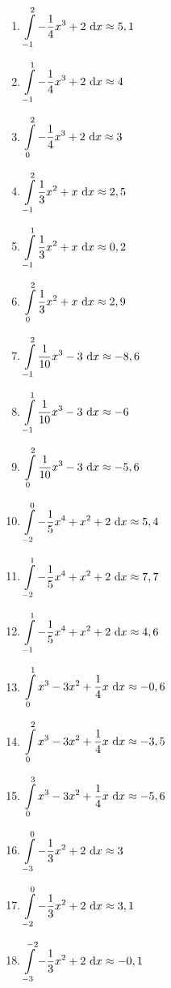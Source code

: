 \begin{Answer}[ref=integralGrafisch1]
	\begin{enumerate}[label=\alph*)]
		\item \(\displaystyle\int\limits_{-1}^{2} -\frac{1}{4}x^3+2\ \text{d} x\approx 5,1\)
		\item \(\displaystyle\int\limits_{-1}^{1} -\frac{1}{4}x^3+2\ \text{d} x\approx 4\)
		\item \(\displaystyle\int\limits_{0}^{2} -\frac{1}{4}x^3+2\ \text{d} x\approx 3\)

		\item \(\displaystyle\int\limits_{-1}^{2} \frac{1}{3}x^2+x\ \text{d} x\approx 2,5\)
		\item \(\displaystyle\int\limits_{-1}^{1} \frac{1}{3}x^2+x\ \text{d} x\approx 0,2\)
		\item \(\displaystyle\int\limits_{0}^{2} \frac{1}{3}x^2+x\ \text{d} x\approx 2,9\)

		\item \(\displaystyle\int\limits_{-1}^{2} \frac{1}{10}x^3-3\ \text{d} x\approx -8,6\)
		\item \(\displaystyle\int\limits_{-1}^{1} \frac{1}{10}x^3-3\ \text{d} x\approx -6\)
		\item \(\displaystyle\int\limits_{0}^{2} \frac{1}{10}x^3-3\ \text{d} x\approx -5,6\)

		\item \(\displaystyle\int\limits_{-2}^{0} -\frac{1}{5}x^4+x^2+2\ \text{d} x\approx 5,4\)
		\item \(\displaystyle\int\limits_{-2}^{1} -\frac{1}{5}x^4+x^2+2\ \text{d} x\approx 7,7\)
		\item \(\displaystyle\int\limits_{-1}^{1} -\frac{1}{5}x^4+x^2+2\ \text{d} x\approx 4,6\)

		\item \(\displaystyle\int\limits_{0}^{1} x^3-3x^2+\frac{1}{4}x\ \text{d} x\approx -0,6\)
		\item \(\displaystyle\int\limits_{0}^{2} x^3-3x^2+\frac{1}{4}x\ \text{d} x\approx -3,5\)
		\item \(\displaystyle\int\limits_{0}^{3} x^3-3x^2+\frac{1}{4}x\ \text{d} x\approx -5,6\)

		\item \(\displaystyle\int\limits_{-3}^{0} -\frac{1}{3}x^2+2\ \text{d} x\approx 3\)
		\item \(\displaystyle\int\limits_{-2}^{0} -\frac{1}{3}x^2+2\ \text{d} x\approx 3,1\)
		\item \(\displaystyle\int\limits_{-3}^{-2} -\frac{1}{3}x^2+2\ \text{d} x\approx -0,1\)
	\end{enumerate}
\end{Answer}